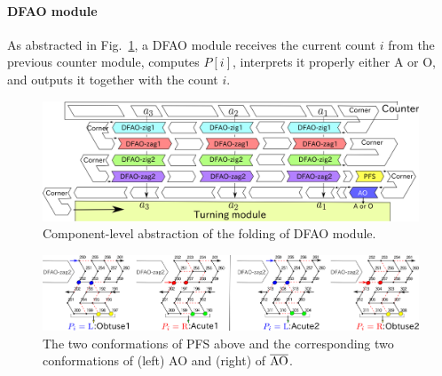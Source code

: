 			\paragraph{DFAO module}
%
As abstracted in Fig.~\ref{fig:abst_dfao}, a DFAO module receives the current count $i$ from the previous counter module, computes $P[i]$, interprets it properly either A or O, and outputs it together with the count $i$. 

\begin{figure}[tp]
\includegraphics[width=\linewidth]{pic/abst_DFAO.png}
\caption{Component-level abstraction of the folding of DFAO module.}
\label{fig:abst_dfao}
\end{figure}


\begin{figure}[h]
\includegraphics[width=\linewidth]{pic/PFS.png}
\caption{The two conformations of PFS above and the corresponding two conformations of (left) AO and (right) of $\overline{\rm AO}$.}
\label{fig:PFS}
\end{figure}

